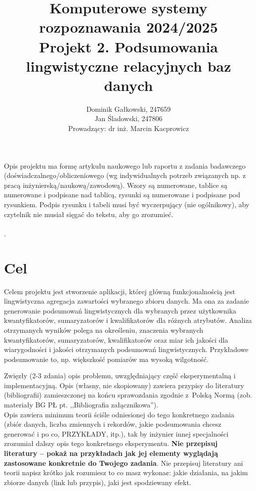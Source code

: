 \documentclass{article}
\author{
	{Dominik Gałkowski, 247659} \\
	{Jan Śladowski, 247806}\\ 
{Prowadzący: dr inż. Marcin Kacprowicz}
}
\title{Komputerowe systemy rozpoznawania 2024/2025\\Projekt 2. Podsumowania lingwistyczne relacyjnych baz danych}
\begin{document}
\maketitle

Opis projektu ma formę artykułu naukowego lub raportu z zadania
badawczego (doświadczalnego/obliczeniowego (wg indywidualnych potrzeb związanych np. z
pracą inżynierską/naukową/zawodową). Wzory są numerowane, tablice są numerowane i podpisane nad
tablicą, rysunki są numerowane i podpisane pod rysunkiem. Podpis rysunku i
tabeli musi być wyczerpujący (nie ogólnikowy), aby czytelnik nie musiał sięgać do tekstu, aby go zrozumieć.\\
\\
. 

\section{Cel}
Celem projektu jest stworzenie aplikacji, której główną funkcjonalnością
jest lingwistyczna agregacja zawartości wybranego zbioru danych. Ma ona za zadanie generowanie podsumowań lingwistycznych dla wybranych przez użytkownika kwantyfikatorów, sumaryzatorów i kwalifikatorów dla różnych atrybutów. Analiza otrzymanych wyników polega na określeniu, znaczenia wybranych kwantyfikatorów, sumaryzatorów, kwalifikatorów oraz miar ich jakości dla wiarygodności i jakości otrzymanych podsumowań lingwistycznych. Przykładowe podsumowanie to, np. większkość pomiarów ma wysoką wilgotność.

Zwięzły (2-3 zdania) opis
problemu, uwzględniający część eksperymentalną i
implementacyjną.  Opis (własny, nie skopiowany) zawiera przypisy do literatury (bibliografii) zamieszczonej na końcu sprawozdania
zgodnie z~Polską Normą (zob. materiały BG PŁ pt. ,,Bibliografia
załącznikowa'').\\ 
\indent Opis zawiera minimum teorii ściśle odniesionej do tego konkretnego zadania (zbiór
danych, liczba zmiennych i rekordów, jakie podsumowania chcesz generować i po
co, PRZYKŁADY, itp.), tak by inżynier innej specjalności zrozumiał dalszy
opis tego konkretnego eksperymentu. {\bf Nie przepisuj literatury -- pokaż na
przykładach jak
jej elementy wyglądają zastosowane konkretnie do Twojego zadania}. 
Nie przepisuj literatury ani teorii 
napisz krótko jak rozumiesz to co masz wykona¢: jakie działania, na
jakim zbiorze danych (link lub przypis), jaki jest spodziewany efekt.\\
\end{document}

